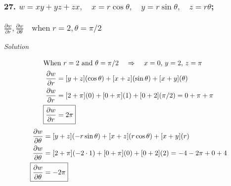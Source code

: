 \documentclass{article}
\newcommand\rr{\quad\Rightarrow\quad}
\newcommand{\solution}{\centerline{\textit{Solution}}}
\newcommand{\pp}[2]{\displaystyle\frac{\partial #1}{\partial #2}}
\begin{document}
\subsubsection*{27. 
    $w = xy + yz +zx,\quad x = r\cos\theta,\quad y = r\sin\theta,\quad z =
    r\theta$;\\\\
    $\pp w r, \pp w \theta\quad \text{when}\;r=2,\theta = \pi/2$
}
\solution
\begin{align*}
    \intertext{When $r=2$ and $\theta=\pi/2$ $\rr$ $x=0$, $y=2$, $z=\pi$}
    \pp w r &= [y+z](\cos\theta)+[x+z](\sin\theta)+[x+y](\theta) \\
    \pp w r &= [2+\pi](0)+[0+\pi](1)+[0+2](\pi/2) = 0+\pi+\pi \\
    \Aboxed{\pp w r &= 2\pi}
\end{align*}
\begin{align*}
    \pp w \theta &= [y+z](-r\sin\theta)+[x+z](r\cos\theta)+[x+y](r) \\
    \pp w \theta &= [2+\pi](-2\cdot 1)+[0+\pi](0)+[0+2](2) = -4 - 2\pi + 0 + 4
    \\
    \Aboxed{\pp w \theta &= -2\pi}
\end{align*}
\newpage
\end{document}
